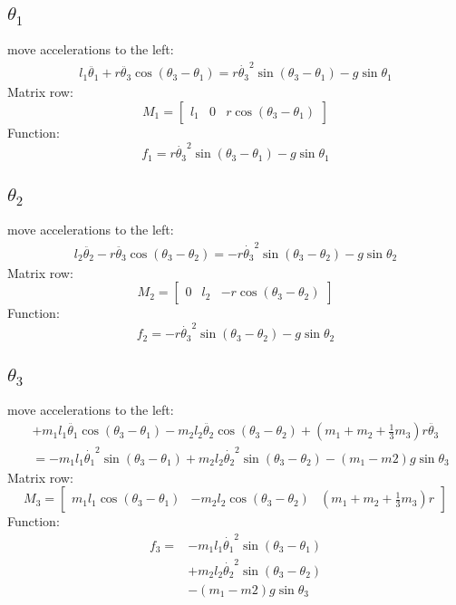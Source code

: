 \documentclass[titlepage]{article}
\numberwithin{equation}{section}
\begin{document}
\pagebreak
\subsection{$\theta_1$}
move accelerations to the left:
\begin{align}
l_1 \ddot{\theta_1} + r \ddot{\theta_3} \cos{(\theta_3 - \theta_1)} = r \dot{\theta_3}^2 \sin{(\theta_3 - \theta_1)} - g \sin \theta_1
\end{align}
Matrix row:
\begin{equation}
M_1 = \begin{bmatrix}
      l_1 & 0 & r \cos{(\theta_3 - \theta_1)}
      \end{bmatrix}
\end{equation}
Function:
\begin{equation}
f_1 = r \dot{\theta_3}^2 \sin{(\theta_3 - \theta_1)} - g \sin \theta_1
\end{equation}

\subsection{$\theta_2$}
move accelerations to the left:
\begin{align}
l_2 \ddot{\theta_2} - r \ddot{\theta_3} \cos{(\theta_3 - \theta_2)} = - r \dot{\theta_3}^2 \sin{(\theta_3 - \theta_2)} - g \sin \theta_2
\end{align}
Matrix row:
\begin{equation}
M_2 = \begin{bmatrix}
      0 & l_2 & - r \cos{(\theta_3 - \theta_2)}
      \end{bmatrix}
\end{equation}
Function:
\begin{equation}
f_2 = - r \dot{\theta_3}^2 \sin{(\theta_3 - \theta_2)} - g \sin \theta_2
\end{equation}

\subsection{$\theta_3$}
move accelerations to the left:
\begin{align}
 &+ m_1 l_1 \ddot{\theta_1} \cos{(\theta_3 - \theta_1)} - m_2 l_2 \ddot{\theta_2} \cos{(\theta_3 - \theta_2)} + (m_1 + m_2 + \frac{1}{3} m_3) r \ddot{\theta_3} \nonumber \\
 &= - m_1 l_1 \dot{\theta_1}^2 \sin{(\theta_3 - \theta_1)} + m_2 l_2 \dot{\theta_2}^2 \sin{(\theta_3 - \theta_2)} - (m_1 - m2) g \sin \theta_3
\end{align}
Matrix row:
\begin{equation}
M_3 = \begin{bmatrix}
      m_1 l_1 \cos{(\theta_3 - \theta_1)} & - m_2 l_2 \cos{(\theta_3 - \theta_2)} & (m_1 + m_2 + \frac{1}{3} m_3) r
      \end{bmatrix}
\end{equation}
Function:
\begin{align}
f_3 = &- m_1 l_1 \dot{\theta_1}^2 \sin{(\theta_3 - \theta_1)} \nonumber \\
    &+ m_2 l_2 \dot{\theta_2}^2 \sin{(\theta_3 - \theta_2)} \nonumber \\
    &- (m_1 - m2) g \sin \theta_3
\end{align}
\end{document}
